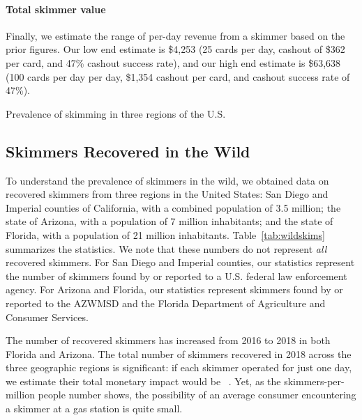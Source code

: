 \paragraph{Total skimmer value}

Finally, we estimate the range of per-day revenue from a skimmer based on the
prior figures. Our low end estimate is \$4,253 (25 cards per day, cashout of
\$362 per card, and 47\% cashout success rate), and our high end estimate is
\$63,638 (100 cards per day per day, \$1,354 cashout per card, and cashout success rate of
47\%).

\begin{table}
\centering
\small

\caption{Prevalence of skimming in three regions of the U.S.}
\label{tab:wildskims}
\end{table}

\subsection{Skimmers Recovered in the Wild}
\label{sec:skimmersinwild}
To understand the prevalence of skimmers in the wild, we obtained data on recovered skimmers from three regions in the United States: San Diego and Imperial counties of California, with a combined population of 3.5 million; the state of Arizona, with a population of 7 million inhabitants; and the state of Florida, with a population of 21 million inhabitants. Table~\ref{tab:wildskims} summarizes the statistics. We note that these numbers do not represent \emph{all} recovered skimmers. For San Diego and Imperial counties, our statistics represent the number of skimmers found by or reported to a U.S. federal law enforcement agency. For Arizona and Florida, our statistics represent skimmers found by or reported to the AZWMSD and the Florida Department of Agriculture and Consumer Services.

The number of recovered skimmers has increased from 2016 to 2018 in both Florida and Arizona. The total number of skimmers recovered in 2018 across the three geographic regions is significant: if each skimmer operated for just one day, we estimate their total monetary impact would be ~\skimmerfraudXVIIIUSA. Yet, as the skimmers-per-million people number shows, the possibility of an average consumer encountering a skimmer at a gas station is quite small.
